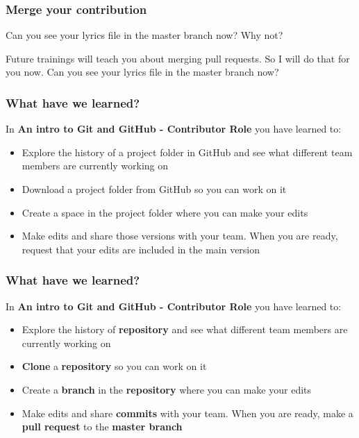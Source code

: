 \documentclass[aspectratio=169]{beamer} %
\begin{document}
\begin{frame}
\frametitle{Merge your contribution}

Can you see your lyrics file in the master branch now? Why not?

\vspace{.5cm}

Future trainings will teach you about merging pull requests. So I will do that for you now. Can you see your lyrics file in the master branch now?

\end{frame}



\begin{frame}
\frametitle{What have we learned?}
	
	In \textbf{An intro to Git and GitHub - Contributor Role} you have learned to:
	
	\begin{itemize}
		\item Explore the history of a project folder in GitHub and see what different team members are currently working on
		\item Download a project folder from GitHub so you can work on it
		\item Create a space in the project folder where you can make your edits
		\item Make edits and share those versions with your team. When you are ready, request that your edits are included in the main version
	\end{itemize}

\end{frame}

\begin{frame}
\frametitle{What have we learned?}

	In \textbf{An intro to Git and GitHub - Contributor Role} you have learned to:
	
	\begin{itemize}
		\item Explore the history of \textbf{repository} and see what different team members are currently working on
		\item \textbf{Clone} a \textbf{repository} so you can work on it
		\item Create a \textbf{branch} in the \textbf{repository} where you can make your edits
		\item Make edits and share \textbf{commits} with your team. When you are ready, make a \textbf{pull request} to the \textbf{master branch}
	\end{itemize}
\end{frame}
\end{document}
